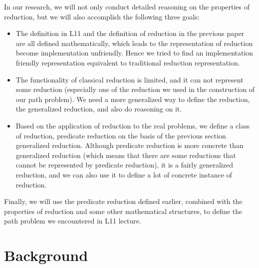 \documentclass[a4paper,12pt,twoside,openright]{report}
\begin{document}
In our research, we will not only conduct detailed reasoning on the properties of reduction, but we will also accomplish the following three goals:
\begin{itemize}
  \item The definition in L11 and the definition of reduction in the previous paper are all defined mathematically, which leads to the representation of reduction become implementation unfriendly. Hence we tried to find an implementation friendly representation equivalent to traditional reduction representation.
  \item The functionality of classical reduction is limited, and it can not represent some reduction (especially one of the reduction we used in the construction of our path problem). We need a more generalized way to define the reduction, the generalized reduction, and also do reasoning on it.
  \item Based on the application of reduction to the real problems, we define a class of reduction, predicate reduction on the basis of the previous section generalized reduction. Although predicate reduction is more concrete than generalized reduction (which means that there are some reductions that cannot be represented by predicate reduction), it is a fairly generalized reduction, and we can also use it to define a lot of concrete instance of reduction.
\end{itemize}
Finally, we will use the predicate reduction defined earlier, combined with the properties of reduction and some other mathematical structures, to define the path problem we encountered in L11 lecture.


\chapter{Background} 

%
\end{document}
